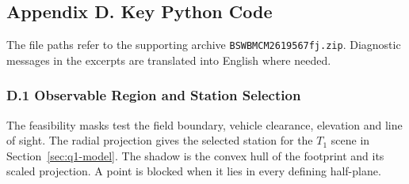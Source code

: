 \documentclass{swmcmthesis}
\begin{document}
\clearpage
\begingroup
\linespread{1}\selectfont

\subsection*{Appendix D. Key Python Code}
\label{app:reproduction}

The file paths refer to the supporting archive \texttt{BSWBMCM2619567fj.zip}. Diagnostic messages in the excerpts are translated into English where needed.

\subsubsection*{D.1 Observable Region and Station Selection}

The feasibility masks test the field boundary, vehicle clearance, elevation and line of sight. The radial projection gives the selected station for the \(T_1\) scene in Section~\ref{sec:q1-model}.
The shadow is the convex hull of the footprint and its scaled projection. A point is blocked when it lies in every defining half-plane.
\end{document}
